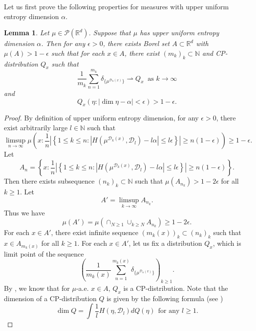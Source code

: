 \documentclass[a4paper,11pt]{amsart}
\newtheorem{lemma}[theorem]{Lemma}
\theoremstyle{definition}
\numberwithin{equation}{section}
\def\to{\rightarrow}
\def\D{\mathcal{D}}
\def\cP{\mathcal P}
\def\N{\mathbb N}
\def\R{\mathbb R}
\begin{document}
Let us first prove the following properties for measures with upper uniform entropy dimension $\alpha$.
\begin{lemma}\label{lemma:unif-dim-meas-generate-unif-dim-CP-dist}
Let $\mu\in \cP(\R^d)$. Suppose that $\mu$ has upper uniform entropy dimension $\alpha$. Then for any $\epsilon>0$, there exists Borel set $A\subset \R^d$ with $\mu(A)>1-\epsilon$ such that for each $x\in A$, there exist $(m_k)_k\subset \N$ and CP-distribution $Q_x$ such that 
\[
\frac{1}{m_k}\sum_{n=1}^{m_k} \delta_{\{ \mu^{\D_n(x)} \}}  \rightharpoonup  Q_x \  \textrm{ as } k\to \infty
\]
and
\[
Q_x\left(\eta: |\dim \eta-\alpha|<\epsilon\right)>1-\epsilon.
\]
\end{lemma}
\begin{proof}
By definition of upper uniform entropy dimension, for any $\epsilon>0$, there exist arbitrarily large  $l\in \N$ such that 
\begin{equation}\label{eq:proof:lemma:unif-dim-meas-generate-unif-dim-CP-dist:1}
\limsup_{n\to\infty}\mu\left( x:\frac{1}{n}\left| \left\{ 1\le k\le n: \left|H(\mu^{\D_k(x)},\D_l)-l\alpha\right| \le l \epsilon \right\} \right| \ge n(1-\epsilon) \right) \ge 1-\epsilon.
\end{equation}
Let 
\[
A_n=\left\{ x:\frac{1}{n}\left| \left\{ 1\le k\le n: \left|H(\mu^{\D_k(x)},\D_l)-l\alpha\right| \le l \epsilon \right\} \right| \ge n(1-\epsilon)  \right\}.
\]
Then there exists subsequence $(n_k)_k\subset \N$ such that $\mu(A_{n_k})>1-2\epsilon$ for all  $k\ge 1$.  Let 
\[
A'=\limsup_{k\to\infty} A_{n_k}.
\]
Thus we have 
\[
\mu(A')=\mu\left( \cap_{N\ge 1}\cup_{k\ge N} A_{n_k} \right)\ge 1-2\epsilon.
\]
For each $x\in A'$, there exist infinite sequence $(m_k(x))_k\subset (n_k)_k$ such that  $x\in A_{m_k(x)}$ for all $k\ge 1$.  For each $x\in A'$, let us fix a distribution $Q_x$, which is limit point  of the sequence 
\begin{equation}\label{eq: proof:lemma:unif-dim-meas-generate-unif-dim-CP-dist:2}
\left( \frac{1}{m_k(x)}\sum_{n=1}^{m_k(x)} \delta_{\{\mu^{\D_n(x)}\}} \right)_{k\ge 1}.
\end{equation}
By \cite[Section 7.5, Theorem 7.1]{HS2012}, we know that for $\mu$-a.e.  $x\in A$, $Q_x$ is a CP-distribution.  Note that the dimension of a CP-distribution $Q$ is given by the following formula (see \cite[Proposition 6.26]{Hochman-lecture-notes2014})
\begin{equation}\label{eq: proof:lemma:unif-dim-meas-generate-unif-dim-CP-dist:3}
\dim Q= \int \frac{1}{l} H(\eta,\D_l)dQ(\eta) \ \  \textrm{for any } l\ge 1.

\end{equation}
\end{proof}
\end{document}
